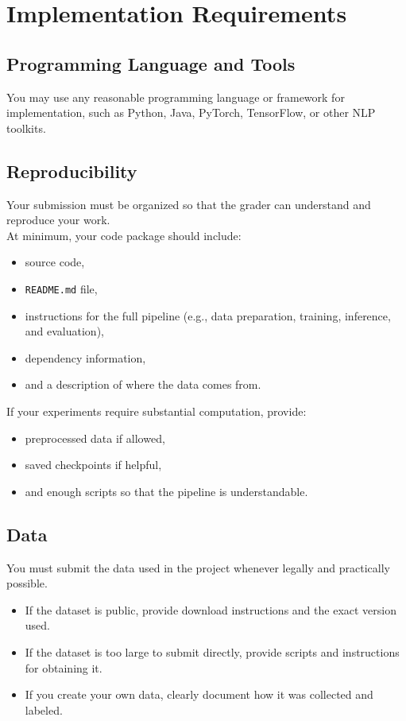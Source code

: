 \documentclass{article}
\begin{document}
\section{Implementation Requirements}

\subsection{Programming Language and Tools}

You may use any reasonable programming language or framework for implementation,
such as Python, Java, PyTorch, TensorFlow, or other NLP toolkits.

\subsection{Reproducibility}

Your submission must be organized so that the grader can understand and reproduce your work. \\

\noindent At minimum, your code package should include:
\begin{itemize}
  \item source code,
  \item \texttt{README.md} file,
  \item instructions for the full pipeline (e.g., data preparation, training, inference, and evaluation),
  \item dependency information,
  \item and a description of where the data comes from.
\end{itemize} 

\noindent If your experiments require substantial computation, provide:
\begin{itemize}
  \item preprocessed data if allowed,
  \item saved checkpoints if helpful,
  \item and enough scripts so that the pipeline is understandable.
\end{itemize}

\subsection{Data}

You must submit the data used in the project whenever legally and practically possible.

\begin{itemize}
  \item If the dataset is public, provide download instructions and the exact version used.
  \item If the dataset is too large to submit directly, provide scripts and instructions for obtaining it.
  \item If you create your own data, clearly document how it was collected and labeled.
\end{itemize}
\end{document}
